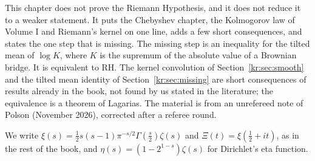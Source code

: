 \label{kr:ch:route}

This chapter does not prove the Riemann Hypothesis, and it does not reduce it to a weaker statement. It puts the Chebyshev chapter, the Kolmogorov law of Volume I and Riemann's kernel on one line, adds a few short consequences, and states the one step that is missing. The missing step is an inequality for the tilted mean of $\log K$, where $K$ is the supremum of the absolute value of a Brownian bridge. It is equivalent to RH. The kernel convolution of Section~\ref{kr:sec:smooth} and the tilted mean identity of Section~\ref{kr:sec:missing} are short consequences of results already in the book, not found by us stated in the literature; the equivalence is a theorem of Lagarias. The material is from an unrefereed note of Polson (November 2026), corrected after a referee round.

We write $\xi(s)=\frac12s(s-1)\pi^{-s/2}\Gamma(\frac s2)\zeta(s)$ and $\Xi(t)=\xi(\frac12+it)$, as in the rest of the book, and $\eta(s)=(1-2^{1-s})\zeta(s)$ for Dirichlet's eta function.

